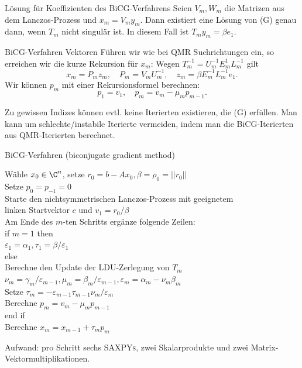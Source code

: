 \begin{karte}{Lösung für Koeffizienten des BiCG-Verfahrens}
    Seien \(V_m, W_m\) die Matrizen aus dem Lanczos-Prozess 
    und \(x_m = V_m y_m\). Dann existiert eine Lösung von (G) 
    genau dann, wenn \(T_m\) nicht singulär ist. In diesem Fall ist 
    \(T_m y_m = \beta e_1\).
\end{karte}

\begin{karte}{BiCG-Verfahren Vektoren}
    Führen wir wie bei QMR Suchrichtungen ein, so erreichen wir die 
    kurze Rekursion für \(x_m\): Wegen \( T_m^{-1} = U_m^{-1} E_m^{1} L_m^{-1} \) gilt 
    \[ x_m = P_m z_m, \quad P_m = V_m U_m^{-1}, \quad z_m = \beta E_m^{-1} L_m^{-1} e_1. \]
    Wir können \(p_m\) mit einer Rekursionsformel berechnen: 
    \[ p_1 = v_1, \quad p_m = v_m - \mu_m p_{m-1}.\]

    Zu gewissen Indizes können evtl. keine Iterierten existieren, die (G) 
    erfüllen. Man kann um schlechte/instabile Iterierte vermeiden, 
    indem man die BiCG-Iterierten aus QMR-Iterierten berechnet. 
\end{karte}

\begin{karte}{BiCG-Verfahren (biconjugate gradient method)}
    \begin{tabbing}
        Wähle \( x_0 \in \C^n \), setze \(r_0 = b - A x_0, \beta = \rho_0 = ||r_0||\) \\
        Setze \( p_0 = p_{-1} = 0 \)  \\
        Starte den nichtsymmetrischen Lanczos-Prozess mit geeignetem \\ 
        linken Startvektor \(c\) und \(v_1 = r_0/\beta\) \\
        Am Ende des \(m\)-ten Schritts ergänze folgende Zeilen:\\
        if \= \(m=1\) then \\
        \> \(\varepsilon_1 = \alpha_1, \tau_1 = \beta/\varepsilon_1\) \\
        else \\
        \> {Berechne den Update der LDU-Zerlegung von \(T_m\)} \\
        \> \( \nu_m = \gamma_m/\varepsilon_{m-1}, \mu_m = \beta_m / \varepsilon_{m-1}, \varepsilon_m = \alpha_m - \nu_m \beta_m \) \\
        \> Setze \( \tau_m = -\varepsilon_{m-1} \tau_{m-1} \nu_m / \varepsilon_m \) \\
        \> Berechne \( p_m = v_m - \mu_m p_{m-1} \) \\
        end if \\
        Berechne \(x_m = x_{m-1} + \tau_m p_m\)
    \end{tabbing}

    Aufwand: pro Schritt sechs \textsc{SAXPYs}, zwei Skalarprodukte und 
    zwei Matrix-Vektormultiplikationen.
\end{karte}

